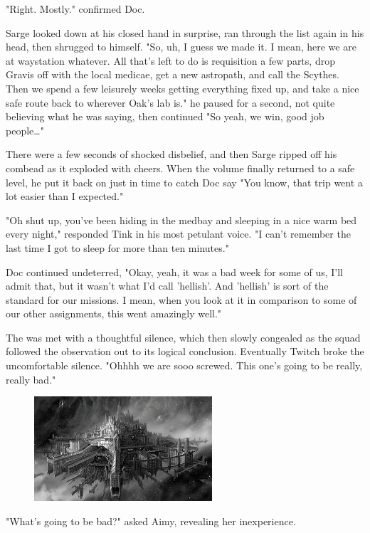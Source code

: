 "Right. 
Mostly." confirmed Doc.

Sarge looked down at his closed hand in surprise, ran through the list again in his head, then shrugged to himself. 
"So, uh, I guess we made it. 
I mean, here we are at waystation whatever. 
All that's left to do is requisition a few parts, drop Gravis off with the local medicae, get a new astropath, and call the Scythes. 
Then we spend a few leisurely weeks getting everything fixed up, and take a nice safe route back to wherever Oak's lab is." he paused for a second, not quite believing what he was saying, then continued "So yeah, we win, good job people…"

There were a few seconds of shocked disbelief, and then Sarge ripped off his combead as it exploded with cheers. 
When the volume finally returned to a safe level, he put it back on just in time to catch Doc say "You know, that trip went a lot easier than I expected."

"Oh shut up, you've been hiding in the medbay and sleeping in a nice warm bed every night," responded Tink in his most petulant voice. 
"I can't remember the last time I got to sleep for more than ten minutes."

Doc continued undeterred, "Okay, yeah, it was a bad week for some of us, I'll admit that, but it wasn't what I'd call 'hellish'. 
And 'hellish' is sort of the standard for our missions. 
I mean, when you look at it in comparison to some of our other assignments, this went amazingly well."

The was met with a thoughtful silence, which then slowly congealed as the squad followed the observation out to its logical conclusion. 
Eventually Twitch broke the uncomfortable silence. 
"Ohhhh we are sooo screwed. 
This one's going to be really, really bad."

\begin{figure}
	\begin{center}
		\includegraphics[width=\figwidth]{pics/13/19.png}
	\end{center}
\end{figure}
"What's going to be bad?" asked Aimy, revealing her inexperience.


